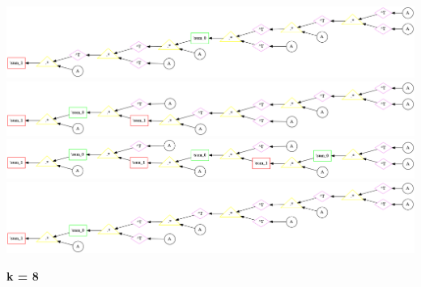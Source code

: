 \begin{center}
\includegraphics[width=0.45\linewidth]{trees/Sym_7_horizontal_11.png}
\includegraphics[width=0.45\linewidth]{trees/Sym_7_horizontal_12.png}
\includegraphics[width=0.45\linewidth]{trees/Sym_7_horizontal_13.png}
\includegraphics[width=0.45\linewidth]{trees/Sym_7_horizontal_14.png}
\end{center}


{\bf k = 8}


